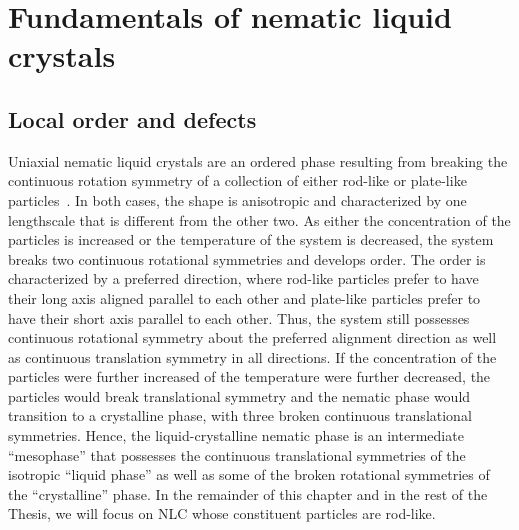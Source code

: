 \chapter{Fundamentals of nematic liquid crystals}

\section{Local order and defects}
Uniaxial nematic liquid crystals are an ordered phase resulting from breaking the continuous rotation symmetry of a collection of either rod-like or plate-like particles~\cite{RN33}.
In both cases, the shape is anisotropic and characterized by one lengthscale that is different from the other two.
As either the concentration of the particles is increased or the temperature of the system is decreased, the system breaks two continuous rotational symmetries and develops order.
The order is characterized by a preferred direction, where rod-like particles prefer to have their long axis aligned parallel to each other and plate-like particles prefer to have their short axis parallel to each other.
Thus, the system still possesses continuous rotational symmetry about the preferred alignment direction as well as continuous translation symmetry in  all directions.
If the concentration of the particles were further increased of the temperature were further decreased, the particles would break translational symmetry and the nematic phase would transition to a crystalline phase, with three broken continuous translational symmetries.
Hence, the liquid-crystalline nematic phase is an intermediate ``mesophase'' that possesses the continuous translational symmetries of the isotropic ``liquid phase'' as well as some of the broken rotational symmetries of the ``crystalline'' phase.
In the remainder of this chapter and in the rest of the Thesis, we will focus on NLC whose constituent particles are rod-like.


